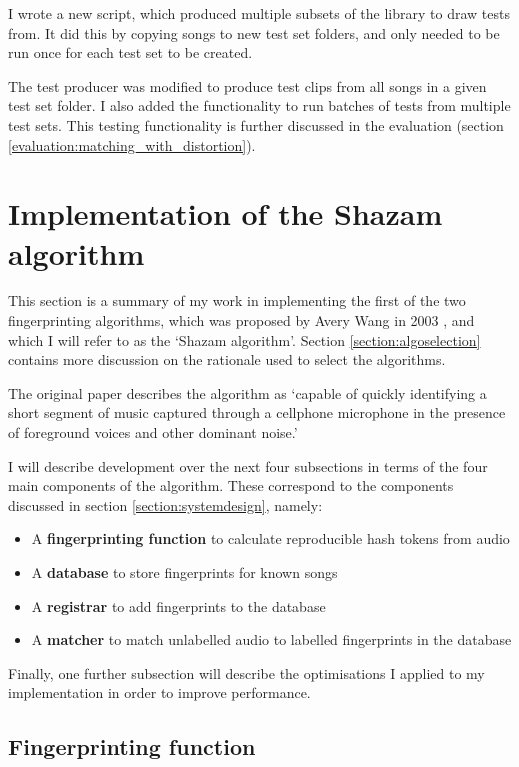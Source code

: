 \documentclass[12pt,a4paper,twoside,openright]{report}
\begin{document}
I wrote a new script, which produced multiple subsets of the library to draw tests from. It did this by copying songs to new test set folders, and only needed to be run once for each test set to be created. 

The test producer was modified to produce test clips from all songs in a given test set folder. I also added the functionality to run batches of tests from multiple test sets. This testing functionality is further discussed in the evaluation (section \ref{evaluation:matching_with_distortion}). 


\section{Implementation of the Shazam algorithm}
\label{section:shazam}

This section is a summary of my work in implementing the first of the two fingerprinting algorithms, which was proposed by Avery Wang in 2003 \cite{Wang03}, and which I will refer to as the `Shazam algorithm'. Section \ref{section:algoselection} contains more discussion on the rationale used to select the algorithms.

The original paper describes the algorithm as `capable of quickly identifying a short segment of music captured through a cellphone microphone in the presence of foreground voices and other dominant noise.' %

I will describe development over the next four subsections in terms of the four main components of the algorithm. These correspond to the components discussed in section \ref{section:systemdesign}, namely: 

\begin{itemize}
  \item A \textbf{fingerprinting function} to calculate reproducible hash tokens from audio
  \item A \textbf{database} to store fingerprints for known songs
  \item A \textbf{registrar} to add fingerprints to the database
  \item A \textbf{matcher} to match unlabelled audio to labelled fingerprints in the database
\end{itemize}

Finally, one further subsection will describe the optimisations I applied to my implementation in order to improve performance.

\subsection{Fingerprinting function}
\end{document}
